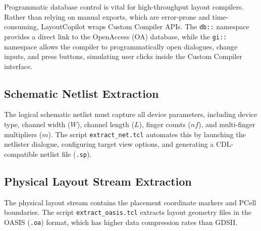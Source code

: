 Programmatic database control is vital for high-throughput layout compilers. Rather than relying on manual exports, which are error-prone and time-consuming, LayoutCopilot wraps Custom Compiler APIs. The \texttt{db::} namespace provides a direct link to the OpenAccess (OA) database, while the \texttt{gi::} namespace allows the compiler to programmatically open dialogues, change inputs, and press buttons, simulating user clicks inside the Custom Compiler interface.

\subsection{Schematic Netlist Extraction}
The logical schematic netlist must capture all device parameters, including device type, channel width ($W$), channel length ($L$), finger counts ($nf$), and multi-finger multipliers ($m$). The script \texttt{extract\_net.tcl} automates this by launching the netlister dialogue, configuring target view options, and generating a CDL-compatible netlist file (\texttt{.sp}).


\subsection{Physical Layout Stream Extraction}
The physical layout stream contains the placement coordinate markers and PCell boundaries. The script \texttt{extract\_oasis.tcl} extracts layout geometry files in the OASIS (\texttt{.oa}) format, which has higher data compression rates than GDSII.


